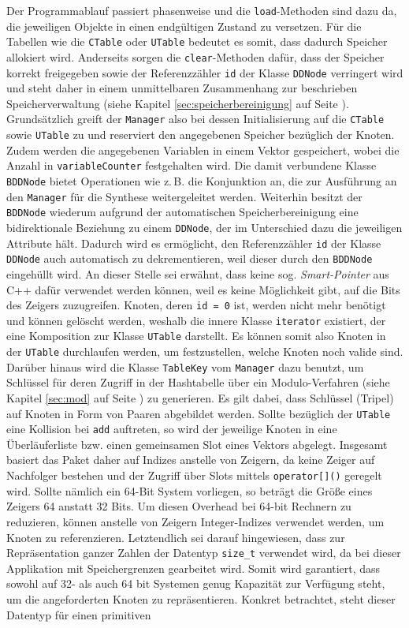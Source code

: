 Der Programmablauf passiert phasenweise und die \texttt{load}-Methoden sind dazu da, die jeweiligen Objekte in einen endgültigen Zustand zu versetzen. Für die Tabellen wie die \texttt{CTable} oder \texttt{UTable} bedeutet es somit, dass dadurch Speicher allokiert wird. Anderseits sorgen die \texttt{clear}-Methoden dafür, dass der Speicher korrekt freigegeben sowie der Referenzzähler \texttt{id} der Klasse \texttt{DDNode} verringert wird und steht daher in einem unmittelbaren Zusammenhang zur beschrieben Speicherverwaltung (siehe Kapitel \ref{sec:speicherbereinigung} auf Seite \pageref{sec:speicherbereinigung}). Grundsätzlich greift der \texttt{Manager} also bei dessen Initialisierung auf die \texttt{CTable} sowie \texttt{UTable} zu und reserviert den angegebenen Speicher bezüglich der Knoten. Zudem werden die angegebenen Variablen in einem Vektor gespeichert, wobei die Anzahl in \texttt{variableCounter} festgehalten wird. Die damit verbundene Klasse \texttt{BDDNode} bietet Operationen wie z.\,B. die Konjunktion an, die zur Ausführung an den \texttt{Manager} für die Synthese weitergeleitet werden. Weiterhin besitzt der \texttt{BDDNode} wiederum aufgrund der automatischen Speicherbereinigung eine bidirektionale Beziehung zu einem \texttt{DDNode}, der im Unterschied dazu die jeweiligen Attribute hält. Dadurch wird es ermöglicht, den Referenzzähler \texttt{id} der Klasse \texttt{DDNode} auch automatisch zu dekrementieren, weil dieser durch den \texttt{BDDNode} eingehüllt wird. An dieser Stelle sei erwähnt, dass keine sog. \emph{Smart-Pointer} aus C++ dafür verwendet werden können, weil es keine Möglichkeit gibt, auf die Bits des Zeigers zuzugreifen. Knoten, deren \texttt{id = 0} ist, werden nicht mehr benötigt und können gelöscht werden, weshalb die innere Klasse \texttt{iterator} existiert, der eine Komposition zur Klasse \texttt{UTable} darstellt. Es können somit also Knoten in der \texttt{UTable} durchlaufen werden, um festzustellen, welche Knoten noch valide sind. Darüber hinaus wird die Klasse \texttt{TableKey} vom \texttt{Manager} dazu benutzt, um Schlüssel für deren Zugriff in der Hashtabelle über ein Modulo-Verfahren (siehe Kapitel \ref{sec:mod} auf Seite \pageref{sec:mod}) zu generieren. Es gilt dabei, dass Schlüssel (Tripel) auf Knoten in Form von Paaren abgebildet werden. Sollte bezüglich der \texttt{UTable} eine Kollision bei \texttt{add} auftreten, so wird der jeweilige Knoten in eine Überläuferliste bzw. einen gemeinsamen Slot eines Vektors abgelegt. Insgesamt basiert das Paket daher auf Indizes anstelle von Zeigern, da keine Zeiger auf Nachfolger bestehen und der Zugriff über Slots mittels \texttt{operator[]()} geregelt wird. Sollte nämlich ein 64-Bit System vorliegen, so beträgt die Größe eines Zeigers 64 anstatt 32 Bits. Um diesen Overhead bei 64-bit Rechnern zu reduzieren, können anstelle von Zeigern Integer-Indizes verwendet werden, um Knoten zu referenzieren. Letztendlich sei darauf hingewiesen, dass zur Repräsentation ganzer Zahlen der Datentyp \texttt{size\_t} verwendet wird, da bei dieser Applikation mit Speichergrenzen gearbeitet wird. Somit wird garantiert, dass sowohl auf 32- als auch 64 bit Systemen genug Kapazität zur Verfügung steht, um die angeforderten Knoten zu repräsentieren. Konkret betrachtet, steht dieser Datentyp für einen primitiven 